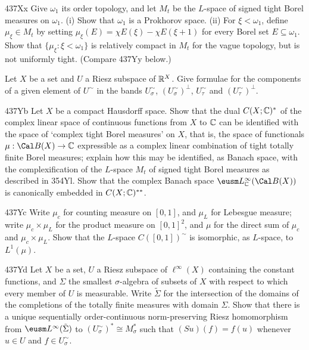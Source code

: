 {\spheader 437Xx Give $\omega_1$ its order topology, and let $M_t$ be the
$L$-space of signed tight Borel measures on $\omega_1$.
(i) Show that $\omega_1$ is a Prokhorov space.   (ii) For
$\xi<\omega_1$, define $\mu_{\xi}\in M_t$
by setting $\mu_{\xi}(E)=\chi E(\xi)-\chi E(\xi+1)$ for every Borel set
$E\subseteq\omega_1$.   Show that $\{\mu_{\xi}:\xi<\omega_1\}$ is
relatively compact in
$M_t$ for the vague topology, but is not uniformly tight.   (Compare 437Yy
below.)

Let $X$ be a set and $U$ a Riesz subspace of $\Bbb R^X$.
Give formulae for the components of a given element of $U^{\sim}$ in the
bands $U^{\sim}_{\sigma}$, $(U^{\sim}_{\sigma})^{\perp}$,
$U^{\sim}_{\tau}$ and $(U^{\sim}_{\tau})^{\perp}$.   

\spheader 437Yb Let $X$ be a compact Hausdorff space.   Show that the
dual $C(X;\Bbb C)^*$ of the
complex linear space of continuous functions from $X$ to $\Bbb C$ can be
identified with the space of `complex tight Borel measures' on $X$, that
is, the space of functionals $\mu:\Cal B(X)\to\Bbb C$ expressible as a
complex linear
combination of tight totally finite Borel measures;  explain how this
may be identified,
as Banach space, with the complexification of the $L$-space $M_t$
of signed tight Borel measures
as described in 354Yl.   Show that the complex Banach space
$\eusm L^{\infty}_{\Bbb C}(\Cal B(X))$ is canonically embedded in
$C(X;\Bbb C)^{**}$.

\spheader 437Yc Write $\mu_c$ for counting measure on $[0,1]$, and
$\mu_L$ for Lebesgue measure;  write $\mu_c\times\mu_L$ for the product
measure on $[0,1]^2$, and $\mu$ for the direct sum of $\mu_c$ and
$\mu_c\times\mu_L$.   Show that the $L$-space $C([0,1])^{\sim}$ is
isomorphic, as $L$-space, to $L^1(\mu)$.   

\spheader 437Yd Let $X$ be a set, $U$ a Riesz subspace of
$\ell^{\infty}(X)$ containing the constant functions, and $\Sigma$ the
smallest $\sigma$-algebra of subsets of $X$ with respect to which every
member of $U$ is measurable.   Write $\tilde\Sigma$ for the intersection
of the domains of the completions of the totally finite measures with
domain $\Sigma$.   Show that there is a unique sequentially
order-continuous
norm-preserving Riesz homomorphism from $\eusm L^{\infty}(\tilde\Sigma)$
to $(U^{\sim}_{\sigma})^*\cong M_{\sigma}^*$ such that $(Su)(f)=f(u)$
whenever $u\in U$ and $f\in U^{\sim}_{\sigma}$.

}

